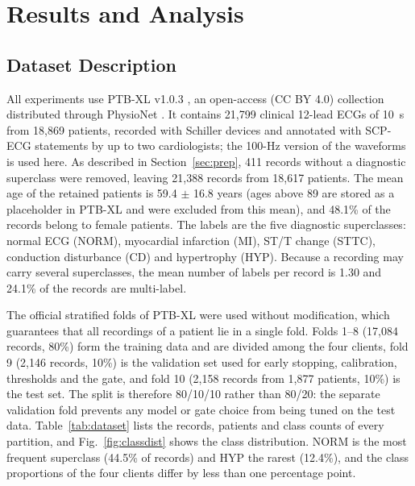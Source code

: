 \section{Results and Analysis}
\label{sec:results}

\subsection{Dataset Description}
\label{sec:dataset}

All experiments use PTB-XL v1.0.3 \cite{wagner2020ptbxl}, an open-access (CC BY 4.0) collection
distributed through PhysioNet \cite{goldberger2000}. It contains 21,799 clinical 12-lead ECGs of
10~s from 18,869 patients, recorded with Schiller devices and annotated with SCP-ECG statements by
up to two cardiologists; the 100-Hz version of the waveforms is used here. As described in
Section~\ref{sec:prep}, 411 records without a diagnostic superclass were removed, leaving 21,388
records from 18,617 patients. The mean age of the retained patients is 59.4 $\pm$ 16.8 years
(ages above 89 are stored as a placeholder in PTB-XL and were excluded from this mean), and 48.1\%
of the records belong to female patients. The labels are the five diagnostic superclasses: normal
ECG (NORM), myocardial infarction (MI), ST/T change (STTC), conduction disturbance (CD) and
hypertrophy (HYP). Because a recording may carry several superclasses, the mean number of labels per
record is 1.30 and 24.1\% of the records are multi-label.

The official stratified folds of PTB-XL were used without modification, which guarantees that all
recordings of a patient lie in a single fold. Folds 1--8 (17,084 records, 80\%) form the training
data and are divided among the four clients, fold 9 (2,146 records, 10\%) is the validation set
used for early stopping, calibration, thresholds and the gate, and fold 10 (2,158 records from
1,877 patients, 10\%) is the test set. The split is therefore 80/10/10 rather than 80/20: the
separate validation fold prevents any model or gate choice from being tuned on the test data.
Table~\ref{tab:dataset} lists the records, patients and class counts of every partition, and
Fig.~\ref{fig:classdist} shows the class distribution. NORM is the most frequent superclass
(44.5\% of records) and HYP the rarest (12.4\%), and the class proportions of the four clients
differ by less than one percentage point.

\begin{table}[!t]
\centering
\caption{Dataset details: records, patients and positive labels per partition (prevalence in \% in parentheses)}
\label{tab:dataset}
\footnotesize

\end{table}

